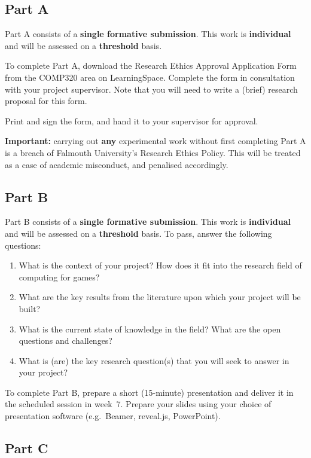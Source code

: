 \subsection*{Part A}

Part A consists of a \textbf{single formative submission}.
This work is \textbf{individual} and will be assessed on a \textbf{threshold} basis.

To complete Part A, download the Research Ethics Approval Application Form
from the COMP320 area on LearningSpace.
Complete the form in consultation with your project supervisor.
Note that you will need to write a (brief) research proposal for this form.

Print and sign the form, and hand it to your supervisor for approval.

\textbf{Important:} carrying out \textbf{any} experimental work
without first completing Part A is a breach of Falmouth University's Research Ethics Policy.
This will be treated as a case of academic misconduct, and penalised accordingly.

\subsection*{Part B}

Part B consists of a \textbf{single formative submission}.
This work is \textbf{individual} and will be assessed on a \textbf{threshold} basis.
To pass, answer the following questions:

\begin{enumerate}[label=(\roman*)]
	\item What is the context of your project? How does it fit into the
		research field of computing for games?
	\item What are the key results from the literature upon which your project will be built?
	\item What is the current state of knowledge in the field?
		What are the open questions and challenges?
	\item What is (are) the key research question(s) that you will seek to
		answer in your project?
\end{enumerate}

To complete Part B, prepare a short (15-minute) presentation 
and deliver it in the scheduled session in week~7.
Prepare your slides using your choice of presentation software
(e.g.\ Beamer, reveal.js, PowerPoint).

\subsection*{Part C}

